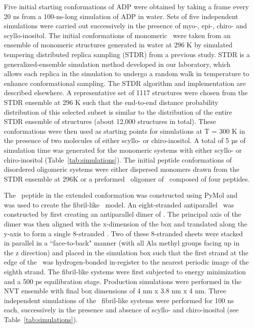 Five initial starting conformations of ADP were obtained by taking a frame every 20 ns from a 100-ns-long simulation of ADP in water. Sets of five independent simulations were carried out successively in the presence of myo-, epi-, chiro- and scyllo-inositol. The initial conformations of monomeric \gafour\ were taken from an ensemble of monomeric structures generated in water at 296 K by simulated tempering distributed replica sampling (STDR) from a previous study.\cite{Nikolic:2011p57} STDR is a generalized-ensemble simulation method developed in our laboratory, which allows each replica in the simulation to undergo a random walk in temperature to enhance conformational sampling.\cite{Rodinger:2006p78} The STDR algorithm and implementation are described elsewhere.\cite{Rauscher:2009p41} A representative set of 1117 structures were chosen from the STDR ensemble at 296 K such that the end-to-end distance probability distribution of this selected subset is similar to the distribution of the entire STDR ensemble of structures (about 12,000 structures in total). These conformations were then used as starting points for simulations at T = 300 K in the presence of two molecules of either scyllo- or chiro-inositol. A total of 5 µs of simulation time was generated for the monomeric systems with either scyllo- or chiro-inositol (Table~\ref{tab:simulations}). The initial peptide conformations of disordered oligomeric systems were either dispersed monomers drawn from the STDR ensemble at 296K or a preformed \bsheet\ oligomer of \gafour\ composed of four peptides.

The \gafour\ peptide in the extended conformation was constructed using PyMol and was used to create the fibril-like \bsheet\ model. An eight-stranded antiparallel \bsheet\ was constructed by first creating an antiparallel dimer of \gafour. The principal axis of the dimer was then aligned with the x-dimension of the box and translated along the y-axis to form a single 8-stranded \bsheet. Two of these 8-stranded sheets were stacked in parallel in a ``face-to-back" manner (with all Ala methyl groups facing up in the z direction) and placed in the simulation box such that the first strand at the edge of the \bsheets\ was hydrogen-bonded in-register to the nearest periodic image of the eighth strand. The fibril-like systems were first subjected to energy minimization and a 500 ps equilibration stage. Production simulations were performed in the NVT ensemble with final box dimensions of 4 nm x 3.8 nm x 4 nm. Three independent simulations of the \gafour\ fibril-like systems were performed for 100 ns each, successively in the presence and absence of scyllo- and chiro-inositol (see Table~\ref{tab:simulations}).

